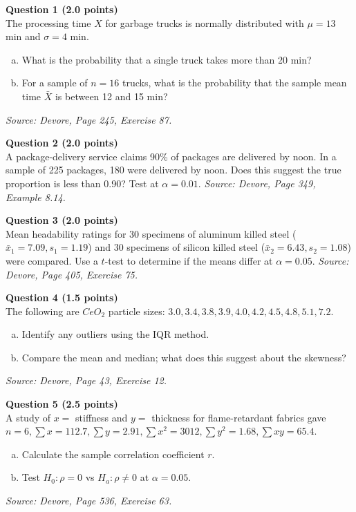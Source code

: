 \documentclass[11pt,a4paper]{article}
\begin{document}
\noindent \textbf{Question 1 (2.0 points)} \\
The processing time $X$ for garbage trucks is normally distributed with $\mu = 13$ min and $\sigma = 4$ min.
\begin{enumerate}[(a)]
    \item What is the probability that a single truck takes more than 20 min?
    \item For a sample of $n=16$ trucks, what is the probability that the sample mean time $\bar{X}$ is between 12 and 15 min?
\end{enumerate}
\textit{Source: Devore, Page 245, Exercise 87.}

\vspace{1em}
\noindent \textbf{Question 2 (2.0 points)} \\
A package-delivery service claims 90\% of packages are delivered by noon. In a sample of 225 packages, 180 were delivered by noon. Does this suggest the true proportion is less than 0.90? Test at $\alpha = 0.01$.
\textit{Source: Devore, Page 349, Example 8.14.}

\vspace{1em}
\noindent \textbf{Question 3 (2.0 points)} \\
Mean headability ratings for 30 specimens of aluminum killed steel ($\bar{x}_1 = 7.09, s_1 = 1.19$) and 30 specimens of silicon killed steel ($\bar{x}_2 = 6.43, s_2 = 1.08$) were compared. Use a $t$-test to determine if the means differ at $\alpha = 0.05$.
\textit{Source: Devore, Page 405, Exercise 75.}

\vspace{1em}
\noindent \textbf{Question 4 (1.5 points)} \\
The following are $CeO_2$ particle sizes: $3.0, 3.4, 3.8, 3.9, 4.0, 4.2, 4.5, 4.8, 5.1, 7.2$.
\begin{enumerate}[(a)]
    \item Identify any outliers using the IQR method.
    \item Compare the mean and median; what does this suggest about the skewness?
\end{enumerate}
\textit{Source: Devore, Page 43, Exercise 12.}

\vspace{1em}
\noindent \textbf{Question 5 (2.5 points)} \\
A study of $x = $ stiffness and $y = $ thickness for flame-retardant fabrics gave $n=6, \sum x = 112.7, \sum y = 2.91, \sum x^2 = 3012, \sum y^2 = 1.68, \sum xy = 65.4$.
\begin{enumerate}[(a)]
    \item Calculate the sample correlation coefficient $r$.
    \item Test $H_0: \rho = 0$ vs $H_a: \rho \neq 0$ at $\alpha = 0.05$.
\end{enumerate}
\textit{Source: Devore, Page 536, Exercise 63.}
\end{document}
